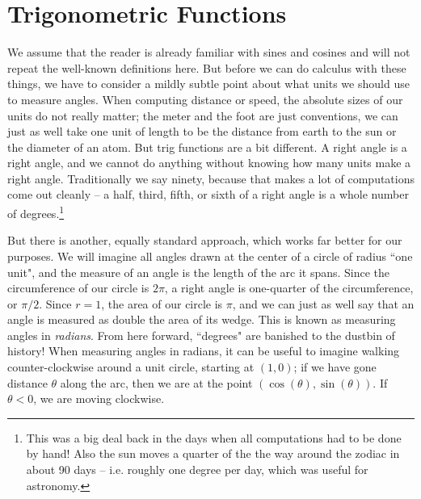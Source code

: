 \section{Trigonometric Functions}
We assume that the reader is already familiar with sines and cosines and will not repeat the well-known definitions here. But before we can do calculus with these things, we have to consider a mildly subtle point about what units we should  use to measure angles. When computing distance or speed, the absolute sizes of our units do not really matter; the meter and the foot are just conventions, we can just as well take one unit of length to be the distance from earth to the sun or the diameter of an atom. But trig functions are a bit different. A right angle is a right angle, and we cannot do anything without knowing how many units make a right angle. Traditionally we say ninety, because that makes a lot of computations come out cleanly -- a half, third, fifth, or sixth of a right angle is a whole number of degrees.\footnote{This was a big deal back in the days when all computations had to be done by hand! Also the sun moves a quarter of the the way around the zodiac in about 90 days -- i.e. roughly one degree per day, which was useful for astronomy.}

But there is another, equally standard approach, which works far better for our purposes. We will imagine all angles drawn at the center of a circle of radius ``one unit", and the measure of an angle is the length of the arc it spans. Since the circumference of our circle is $2\pi$, a right angle is one-quarter of the circumference, or $\pi/2$.  Since $r=1$, the area of our circle is $\pi$, and we can just as well say that an angle is measured as double the area of its wedge. This is known as measuring angles in \emph{radians}. From here forward, ``degrees" are banished to the dustbin of history! When measuring angles in radians, it can be useful to imagine walking counter-clockwise around a unit circle, starting at $(1,0)$; if we have gone distance $\theta$ along the arc, then we are at the point $(\cos(\theta), \sin(\theta))$. If $\theta < 0$, we are moving clockwise.

